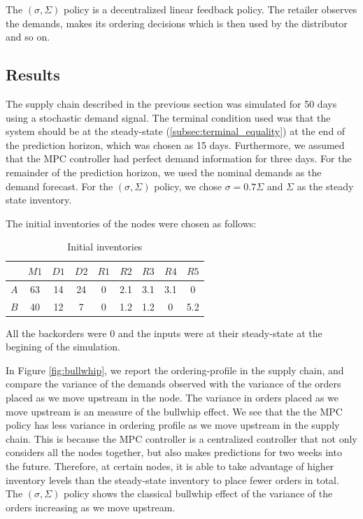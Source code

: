 \documentclass[10pt]{article}
\theoremstyle{definition}
\begin{document}
The $(\sigma,\Sigma)$ policy is a decentralized linear feedback policy. The retailer
observes the demands, makes its ordering decisions which is then used
by the distributor and so on. 

\subsection{Results}
The supply chain described in the previous section was simulated for
50 days using a stochastic demand signal. The terminal
condition used was that the system should be at the steady-state
(\ref{subsec:terminal_equality}) at the end of the prediction horizon,
which was chosen as 15 days. Furthermore, we assumed that the MPC
controller had perfect demand information for three days. For the
remainder of the prediction horizon, we used the nominal demands as
the demand forecast. For the $(\sigma,\Sigma)$ policy, we chose
$\sigma = 0.7\Sigma$ and $\Sigma$ as the steady state inventory. 

The initial inventories of the nodes were chosen as follows:
\begin{table}
\caption{Initial inventories}
\label{tab:initial}
\begin{center}
\begin{tabular}{ccccccccc}\toprule
& $M1$ & $D1$ & $D2$  & $R1$ & $R2$ & $R3$ & $R4$ & $R5$ \\
\midrule
$A$                      &63   &14   &24   &0 &2.1  &3.1  &3.1&0 \\
$B$                      &40   &12   &7    &0 &1.2  &1.2  &0  &5.2   \\
\bottomrule
\end{tabular}
\end{center}
\end{table}
All the backorders were $0$ and the inputs were at their steady-state
at the begining of the simulation.

In Figure \ref{fig:bullwhip}, we report the ordering-profile in the supply
chain, and compare the variance of the demands observed with the
variance of the orders placed as we move upstream in the node. The
variance in orders placed as we move upstream is an measure of the
bullwhip effect. We see that the the MPC policy has less variance in
ordering profile as we move upstream in the supply chain. This is
because the MPC controller is a centralized controller that not only
considers all the nodes together, but also makes predictions for two
weeks into the future. Therefore, at certain nodes, it is able to take
advantage of higher inventory levels than the steady-state inventory
to place fewer orders in total. The $(\sigma,\Sigma)$ policy shows the
classical bullwhip effect of the variance of the orders increasing as
we move upstream. 
\end{document}
